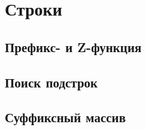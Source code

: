 \chapter{Строки}

\section{Префикс- и Z-функция}

\section{Поиск подстрок}

\section{Суффиксный массив}
